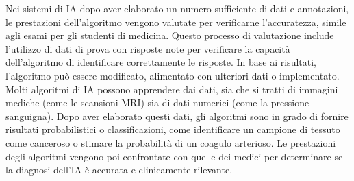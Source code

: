 Nei sistemi di IA dopo aver elaborato un numero sufficiente di dati e annotazioni, le prestazioni dell'algoritmo vengono valutate per verificarne l'accuratezza, simile agli esami per gli studenti di medicina. Questo processo di valutazione include l'utilizzo di dati di prova con risposte note per verificare la capacità dell'algoritmo di identificare correttamente le risposte. In base ai risultati, l'algoritmo può essere modificato, alimentato con ulteriori dati o implementato.\\

Molti algoritmi di IA possono apprendere dai dati, sia che si tratti di immagini mediche (come le scansioni MRI) sia di dati numerici (come la pressione sanguigna). Dopo aver elaborato questi dati, gli algoritmi sono in grado di fornire risultati probabilistici o classificazioni, come identificare un campione di tessuto come canceroso o stimare la probabilità di un coagulo arterioso. Le prestazioni degli algoritmi vengono poi confrontate con quelle dei medici per determinare se la diagnosi dell'IA è accurata e clinicamente rilevante.\\

